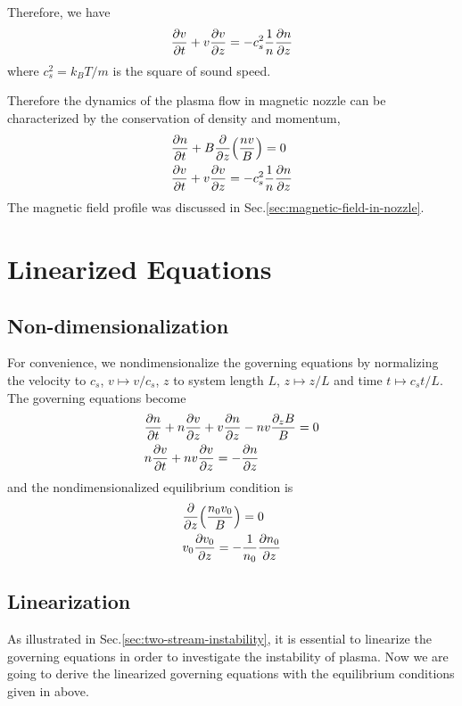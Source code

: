 Therefore, we have
\begin{equation}
	\pdv{v}{t} + v\pdv{v}{z} = -c_s^2\frac{1}{n}\pdv{n}{z} 
\end{equation}
where $c_s^2 = k_BT/m$ is the square of sound speed.

Therefore the dynamics of the plasma flow in magnetic nozzle can be characterized by the conservation of density and momentum,
\begin{align*}
	&\pdv{n}{t} + B\pdv{z}(\frac{nv}{B}) = 0\\
	&\pdv{v}{t} + v\pdv{v}{z} = -c_s^2\frac{1}{n}\pdv{n}{z}
\end{align*}
The magnetic field profile was discussed in Sec.\ref{sec:magnetic-field-in-nozzle}.

\section{Linearized Equations}
\subsection{Non-dimensionalization}
For convenience, we nondimensionalize the governing equations by normalizing the velocity to $c_s$, $v\mapsto v/c_s$, $z$ to system length $L$, $z \mapsto z/L$ and time $t\mapsto c_s t/L$. The governing equations become
\begin{align}
    &\pdv{n}{t} + n\pdv{v}{z} + v\pdv{n}{z} - nv\frac{\partial_z B}{B} = 0 
	\label{eq:conservation-of-density}
	\\
    &n\pdv{v}{t} + nv\pdv{v}{z} = -\pdv{n}{z}
	\label{eq:conservation-of-momentum}
\end{align}
and the nondimensionalized equilibrium condition is
\begin{align}
    &\pdv{z}(\frac{n_0v_0}{B}) = 0 \label{eq:equilibrium-convervation-of-mass}\\
    &v_0\pdv{v_0}{z} = -\frac{1}{n_0}\pdv{n_0}{z} \label{eq:equilibrium-convervation-of-momentum}
\end{align}

\subsection{Linearization}
As illustrated in Sec.\ref{sec:two-stream-instability}, it is essential to linearize the governing equations in order to investigate the instability of plasma. Now we are going to derive the linearized governing equations with the equilibrium conditions given in above.

